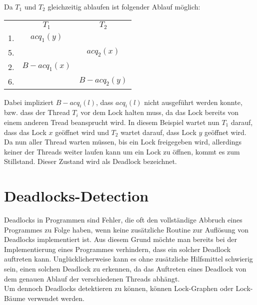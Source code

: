 Da $T_1$ und $T_2$ gleichzeitig ablaufen ist folgender Ablauf möglich:
\begin{table}[H]
    \centering
    \begin{tabular}{ccc}
       & $T_1$          & $T_2$          \\
    1. & $acq_{1}(y)$ &                \\
    5. &                & $acq_{2}(x)$ \\
    2. & $B-acq_{1}(x)$ &                \\
    6. &                & $B-acq_{2}(y)$
    \end{tabular}
\end{table}
Dabei impliziert $B-acq_i(l)$, dass $acq_{i}(l)$ nicht ausgeführt werden konnte,
bzw. dass der Thread $T_i$ vor dem Lock halten muss, da das Lock bereits von 
einem anderen Tread beansprucht wird. In diesem Beispiel wartet nun $T_1$ 
darauf, dass das Lock $x$ geöffnet wird und $T_2$ wartet darauf, dass Lock 
$y$ geöffnet wird. Da nun aller Thread warten müssen, bis ein Lock freigegeben 
wird, allerdings keiner der Threads weiter laufen kann um ein Lock zu öffnen, 
kommt es zum Stillstand. Dieser Zustand wird als Deadlock bezeichnet.
\section{Deadlocks-Detection}
Deadlocks in Programmen sind Fehler, die oft den vollständige Abbruch eines 
Programmes zu Folge haben, wenn keine zusätzliche Routine zur Auflösung von 
Deadlocks implementiert ist. Aus diesem Grund möchte man bereits bei der 
Implementierung eines Programmes verhindern, dass ein solcher Deadlock auftreten 
kann. Unglücklicherweise kann es ohne zusätzliche Hilfsmittel schwierig sein, 
einen solchen Deadlock zu erkennen, da das Auftreten eines Deadlock von dem 
genauen Ablauf der verschiedenen Threads abhängt.\\ Um dennoch Deadlocks 
detektieren zu können, können Lock-Graphen oder Lock-Bäume verwendet werden.
